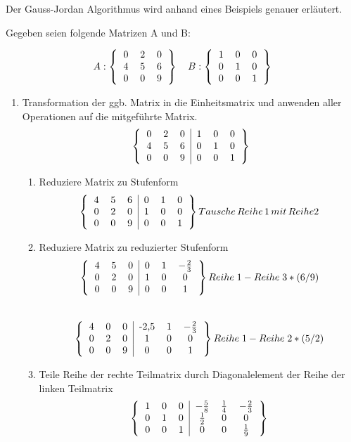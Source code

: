 Der Gauss-Jordan Algorithmus wird anhand eines Beispiels genauer erläutert.

Gegeben seien folgende Matrizen A und B:

\[
A:
\left\{\begin{tabular}{ccc}
0 & 2 & 0 \\
4 & 5 & 6 \\
0 & 0 & 9
\end{tabular}
\right\}\quad
B:
\left\{\begin{tabular}{ccc}
1 & 0 & 0 \\
0 & 1 & 0\\
0 & 0 & 1
\end{tabular}
\right\}
\]
\begin{enumerate}
	\item Transformation der ggb. Matrix in die Einheitsmatrix und anwenden aller Operationen auf die mitgeführte Matrix.
	\[
	\left\{\begin{tabular}{ccc|ccc}
	0 & 2 & 0 & 1 & 0 & 0 \\
	4 & 5 & 6 & 0 & 1 & 0\\
	0 & 0 & 9 & 0 & 0 & 1
	\end{tabular}
	\right\}
	\]
	\begin{enumerate}[label*=\arabic*]
		\item Reduziere Matrix zu Stufenform
			\[
		\left\{\begin{tabular}{ccc|ccc}
		4 & 5 & 6 & 0 & 1 & 0 \\
		0 & 2 & 0 & 1 & 0 & 0\\
		0 & 0 & 9 & 0 & 0 & 1
		\end{tabular}
		\right\}	Tausche\,Reihe\,1\,mit\,Reihe 2
		\]
		\item Reduziere Matrix zu reduzierter Stufenform
		\[
		\left\{\begin{tabular}{ccc|ccc}
		4 & 5 & 0 & 0 & 1 & $-\frac{2}{3}$ \\
		0 & 2 & 0 & 1 & 0 & 0\\
		0 & 0 & 9 & 0 & 0 & 1
		\end{tabular}
		\right\}	Reihe\;1 - Reihe\;3 * (6 / 9)
		\]
		\\
		\[
		\left\{\begin{tabular}{ccc|ccc}
		4 & 0 & 0 & -2,5 & 1 & $-\frac{2}{3}$ \\
		0 & 2 & 0 & 1 & 0 & 0\\
		0 & 0 & 9 & 0 & 0 & 1
		\end{tabular}
		\right\}	Reihe\;1 - Reihe\;2 * (5 / 2)
		\]
		\item Teile Reihe der rechte Teilmatrix durch Diagonalelement der Reihe der linken Teilmatrix
		\[
		\left\{\begin{tabular}{ccc|ccc}
		1 & 0 & 0 & $-\frac{5}{8}$ & $\frac{1}{4}$ & $-\frac{2}{3}$ \\
		0 & 1 & 0 & $\frac{1}{2}$ & 0 & 0\\
		0 & 0 & 1 & 0 & 0 & $\frac{1}{9}$
		\end{tabular}
		\right\}
		\]
	\end{enumerate}
\end{enumerate}
